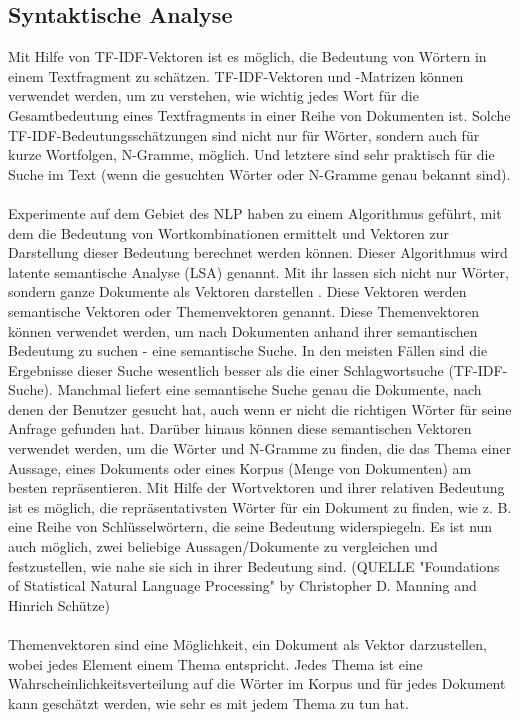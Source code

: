 \subsection{Syntaktische Analyse}
Mit Hilfe von \ac{TF-IDF}-Vektoren ist es möglich, die Bedeutung von Wörtern in einem Textfragment zu schätzen. 
\ac{TF-IDF}-Vektoren und -Matrizen können verwendet werden, um zu verstehen, wie wichtig jedes Wort für die Gesamtbedeutung eines Textfragments in einer Reihe von Dokumenten ist. 
Solche \ac{TF-IDF}-Bedeutungsschätzungen sind nicht nur für Wörter, sondern auch für kurze Wortfolgen, N-Gramme, möglich. 
Und letztere sind sehr praktisch für die Suche im Text (wenn die gesuchten Wörter oder N-Gramme genau bekannt sind).\\\\
Experimente auf dem Gebiet des \ac{NLP} haben zu einem Algorithmus geführt, mit dem die Bedeutung von Wortkombinationen ermittelt und Vektoren zur Darstellung dieser Bedeutung berechnet werden können. 
Dieser Algorithmus wird latente semantische Analyse (\ac{LSA}) genannt. 
Mit ihr lassen sich nicht nur Wörter, sondern ganze Dokumente als Vektoren darstellen \cite{rygl_semantic_2017}.
Diese Vektoren werden semantische Vektoren oder Themenvektoren genannt. 
Diese Themenvektoren können verwendet werden, um nach Dokumenten anhand ihrer semantischen Bedeutung zu suchen - eine semantische Suche. 
In den meisten Fällen sind die Ergebnisse dieser Suche wesentlich besser als die einer Schlagwortsuche (\ac{TF-IDF}-Suche). 
Manchmal liefert eine semantische Suche genau die Dokumente, nach denen der Benutzer gesucht hat, auch wenn er nicht die richtigen Wörter für seine Anfrage gefunden hat. 
Darüber hinaus können diese semantischen Vektoren verwendet werden, um die Wörter und N-Gramme zu finden, die das Thema einer Aussage, eines Dokuments oder eines Korpus (Menge von Dokumenten) am besten repräsentieren. 
Mit Hilfe der Wortvektoren und ihrer relativen Bedeutung ist es möglich, die repräsentativsten Wörter für ein Dokument zu finden, wie z. B. eine Reihe von Schlüsselwörtern, die seine Bedeutung widerspiegeln. 
Es ist nun auch möglich, zwei beliebige Aussagen/Dokumente zu vergleichen und festzustellen, wie nahe sie sich in ihrer Bedeutung sind. (QUELLE "Foundations of Statistical Natural Language Processing" by Christopher D. Manning and Hinrich Schütze)\\\\
Themenvektoren sind eine Möglichkeit, ein Dokument als Vektor darzustellen, wobei jedes Element einem Thema entspricht. 
Jedes Thema ist eine Wahrscheinlichkeitsverteilung auf die Wörter im Korpus und für jedes Dokument kann geschätzt werden, wie sehr es mit jedem Thema zu tun hat.

